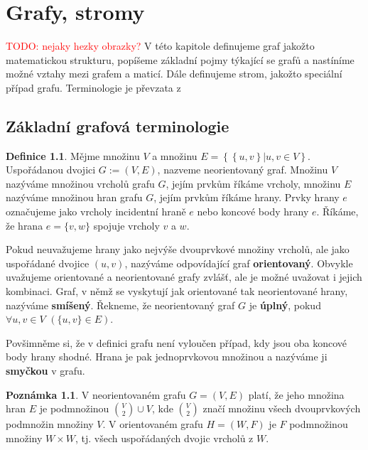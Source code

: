 \documentclass[11pt,american,czech,oneside]{book}
\theoremstyle{plain}
\theoremstyle{definition}
\newtheorem{definition}{Definice}
\newtheorem{remark}{Poznámka}
\newcommand{\TODO}[1]{\textcolor{red}{TODO: #1}\PackageWarning{TODO:}{#1!}}
\begin{document}

\chapter{Grafy, stromy} \TODO{nejaky hezky obrazky?} 
V této kapitole definujeme graf jakožto matematickou strukturu, popíšeme základní pojmy týkající se grafů a nastíníme možné vztahy mezi grafem a maticí. Dále definujeme strom, jakožto speciální případ grafu. Terminologie je převzata z \cite{koub:11}

\section{Základní grafová terminologie}

\begin{definition}
  Mějme množinu $V$ a množinu $E = \left\{ \left\{ u,v \right\} | u,v \in V \right\}$. Uspořádanou dvojici $G := (V,E)$, nazveme neorientovaný graf. Množinu $V$ nazýváme množinou vrcholů grafu $G$, jejím prvkům říkáme vrcholy, množinu $E$ nazýváme množinou hran grafu $G$, jejím prvkům říkáme hrany. Prvky hrany $e$ označujeme jako vrcholy incidentní hraně $e$ nebo koncové body hrany $e$. Říkáme, že hrana $e = \{v,w\}$ spojuje vrcholy $v$ a $w$.
\end{definition}

Pokud neuvažujeme hrany jako nejvýše dvouprvkové množiny vrcholů, ale  jako uspořádané dvojice $(u,v)$, nazýváme odpovídající graf \textbf{orientovaný}. Obvykle uvažujeme orientované a neorientované grafy zvlášť, ale je možné uvažovat i jejich kombinaci. Graf, v němž se vyskytují jak orientované tak neorientované hrany, nazýváme \textbf{smíšený}. Řekneme, že neorientovaný graf $G$ je \textbf{úplný}, pokud $\forall u, v \in V$ $\left(\{u,v\} \in E\right)$.

Povšimněme si, že v definici grafu není vyloučen případ, kdy jsou oba koncové body hrany shodné. Hrana je pak jednoprvkovou množinou a nazýváme ji \textbf{smyčkou} v grafu.

\begin{remark}
  V neorientovaném grafu $G=(V,E)$ platí, že jeho množina hran $E$ je podmnožinou ${V \choose 2} \cup V$, kde $V \choose 2$ značí množinu všech dvouprvkových podmnožin množiny $V$. V orientovaném grafu $H=(W,F)$ je $F$ podmnožinou množiny $W \times W$, tj. všech uspořádaných dvojic vrcholů z $W$.
\end{remark}
\end{document}
